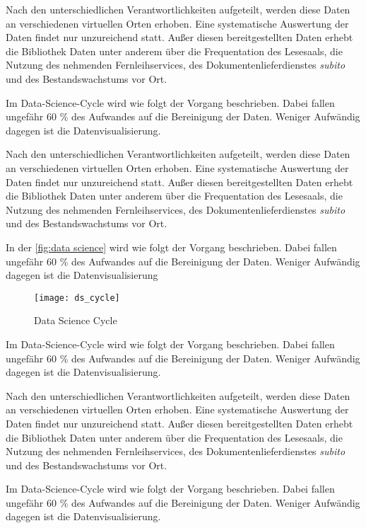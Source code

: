 Nach den unterschiedlichen Verantwortlichkeiten aufgeteilt, werden diese Daten an verschiedenen virtuellen Orten erhoben.
Eine systematische Auswertung der Daten findet nur unzureichend statt.
Außer diesen bereitgestellten Daten erhebt die Bibliothek Daten unter anderem über
die Frequentation des Lesesaals, die Nutzung des nehmenden Fernleihservices, des
Dokumentenlieferdienstes \textit{subito} und des Bestandswachstums vor Ort.

Im Data-Science-Cycle wird wie folgt der Vorgang beschrieben. Dabei fallen ungefähr 60 \% des Aufwandes auf die Bereinigung der Daten. 
Weniger Aufwändig dagegen ist die Datenvisualisierung.



Nach den unterschiedlichen Verantwortlichkeiten aufgeteilt, werden diese Daten an verschiedenen virtuellen Orten erhoben.
Eine systematische Auswertung der Daten findet nur unzureichend statt.
Außer diesen bereitgestellten Daten erhebt die Bibliothek Daten unter anderem über
die Frequentation des Lesesaals, die Nutzung des nehmenden Fernleihservices, des
Dokumentenlieferdienstes \textit{subito} und des Bestandswachstums vor Ort.

In der \autoref{fig:data science} wird wie folgt der Vorgang beschrieben. Dabei fallen ungefähr 60 \% des Aufwandes auf die Bereinigung der Daten. 
Weniger Aufwändig dagegen ist die Datenvisualisierung

\begin{figure}[h]
    \centering
        \texttt{[image: ds\_cycle]}
        \caption{Data Science Cycle}
        \label{fig:data science}
\end{figure}



Im Data-Science-Cycle wird wie folgt der Vorgang beschrieben. Dabei fallen ungefähr 60 \% des Aufwandes auf die Bereinigung der Daten. 
Weniger Aufwändig dagegen ist die Datenvisualisierung.

Nach den unterschiedlichen Verantwortlichkeiten aufgeteilt, werden diese Daten an verschiedenen virtuellen Orten erhoben.
Eine systematische Auswertung der Daten findet nur unzureichend statt.
Außer diesen bereitgestellten Daten erhebt die Bibliothek Daten unter anderem über
die Frequentation des Lesesaals, die Nutzung des nehmenden Fernleihservices, des
Dokumentenlieferdienstes \textit{subito} und des Bestandswachstums vor Ort.

Im Data-Science-Cycle wird wie folgt der Vorgang beschrieben. Dabei fallen ungefähr 60 \% des Aufwandes auf die Bereinigung der Daten. 
Weniger Aufwändig dagegen ist die Datenvisualisierung.